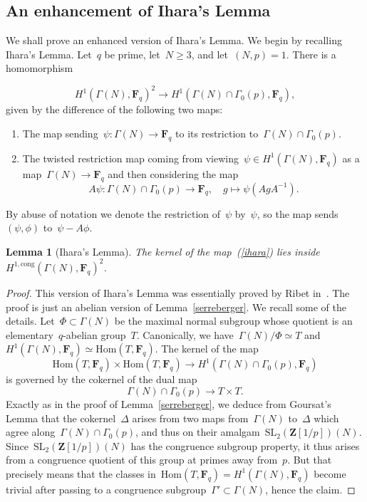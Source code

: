 \documentclass[10pt]{amsart}
\def\Hcong{H^{1,\mathrm{cong}}}
\def\F{\mathbf{F}}
\def\Z{\mathbf{Z}}
\def\Hom{\mathrm{Hom}}
\newtheorem{lemma}[subsubsection]{Lemma}
\theoremstyle{remark}
\numberwithin{equation}{subsection}
\def\numequation{\addtocounter{subsubsection}{1}\begin{equation}}
\def\SL{\mathrm{SL}}
\begin{document}
\subsection{An enhancement of Ihara's Lemma}
\label{enhancedihara} 
We shall prove an enhanced version of Ihara's Lemma. We begin
by recalling Ihara's Lemma.
 Let~$q$ be prime, let~$N \ge 3$,  and let~$(N,p) = 1$. There is a homomorphism
\numequation \label{ihara}
H^1(\Gamma(N),\F_q)^{2} \rightarrow H^1(\Gamma(N) \cap \Gamma_0(p),\F_q),
\end{equation}
given by the difference of the following two maps:
\begin{enumerate}
\item The map sending~$\psi: \Gamma(N) \rightarrow \F_q$ to its restriction to~$\Gamma(N) \cap \Gamma_0(p)$.
\item The twisted restriction map coming from viewing~$\psi \in H^1(\Gamma(N),\F_q)$ as a map~$\Gamma(N) \rightarrow \F_q$
and then considering the map
$$A\psi: \Gamma(N) \cap \Gamma_0(p) \rightarrow \F_q, \quad g \mapsto \psi(A g A^{-1}).$$
\end{enumerate}
By abuse of notation we denote the restriction of~$\psi$ by~$\psi$, so the map sends~$(\psi,\phi)$ to~$\psi - A \phi$.

\begin{lemma}[Ihara's Lemma]  \label{ihararibet} The kernel of the map~(\ref{ihara}) lies 
inside~$\Hcong(\Gamma(N),\F_q)^2$. 
\end{lemma}

\begin{proof} This version of Ihara's Lemma was essentially proved
by Ribet in~\cite{RibetICM}. The proof is just an abelian version
of Lemma~\ref{serreberger}. 
We recall some of the details.
Let~$\Phi \subset \Gamma(N)$ be the maximal normal subgroup whose quotient is an
elementary~$q$-abelian group~$T$. Canonically, we have~$\Gamma(N)/\Phi \simeq T$
and~$H^1(\Gamma(N),\F_q) \simeq \Hom(T,\F_q)$. The kernel of the map
$$\Hom(T,\F_q) \times \Hom(T,\F_q) \rightarrow H^1(\Gamma(N) \cap \Gamma_0(p),\F_q)$$
is governed by the cokernel of the dual map
$$\Gamma(N) \cap \Gamma_0(p) \rightarrow T \times T.$$
Exactly as in the proof of Lemma~\ref{serreberger}, we deduce from
Goursat's Lemma that the cokernel~$\Delta$ arises
from two maps from~$\Gamma(N)$ to~$\Delta$ which agree along~$\Gamma(N)
\cap \Gamma_0(p)$, and thus on their amalgam~$\SL_2(\Z[1/p])(N)$.
Since~$\SL_2(\Z[1/p])(N)$ has the congruence subgroup property, it thus
arises from a congruence quotient of this group at primes away from~$p$.
 But that precisely means that the
classes in~$\Hom(T,\F_q) = H^1(\Gamma(N),\F_q)$ become trivial after passing to
a congruence subgroup~$\Gamma' \subset \Gamma(N)$, hence the claim.
\end{proof}
\end{document}
